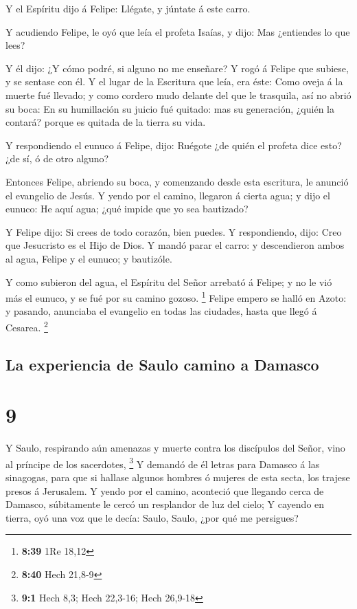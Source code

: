  Y el Espíritu dijo á Felipe: Llégate, y júntate á este
carro.

 Y acudiendo Felipe, le oyó que leía el profeta Isaías, y
dijo: Mas ¿entiendes lo que lees?

 Y él dijo: ¿Y cómo podré, si alguno no me enseñare? Y
rogó á Felipe que subiese, y se sentase con él.  Y el
lugar de la Escritura que leía, era éste: Como oveja á la muerte fué
llevado; y como cordero mudo delante del que le trasquila, así no abrió
su boca:  En su humillación su juicio fué quitado: mas su
generación, ¿quién la contará? porque es quitada de la tierra su vida.

 Y respondiendo el eunuco á Felipe, dijo: Ruégote ¿de
quién el profeta dice esto? ¿de sí, ó de otro alguno?

 Entonces Felipe, abriendo su boca, y comenzando desde
esta escritura, le anunció el evangelio de Jesús.  Y
yendo por el camino, llegaron á cierta agua; y dijo el eunuco: He aquí
agua; ¿qué impide que yo sea bautizado?

 Y Felipe dijo: Si crees de todo corazón, bien puedes. Y
respondiendo, dijo: Creo que Jesucristo es el Hijo de Dios.
 Y mandó parar el carro: y descendieron ambos al agua,
Felipe y el eunuco; y bautizóle.

 Y como subieron del agua, el Espíritu del Señor arrebató
á Felipe; y no le vió más el eunuco, y se fué por su camino gozoso.
\footnote{\textbf{8:39} 1Re 18,12}  Felipe empero se
halló en Azoto: y pasando, anunciaba el evangelio en todas las ciudades,
hasta que llegó á Cesarea. \footnote{\textbf{8:40} Hech 21,8-9}

\hypertarget{la-experiencia-de-saulo-camino-a-damasco}{%
\subsection{La experiencia de Saulo camino a
Damasco}\label{la-experiencia-de-saulo-camino-a-damasco}}

\hypertarget{section-8}{%
\section{9}\label{section-8}}

 Y Saulo, respirando aún amenazas y muerte contra los
discípulos del Señor, vino al príncipe de los sacerdotes, \footnote{\textbf{9:1}
  Hech 8,3; Hech 22,3-16; Hech 26,9-18}  Y demandó de él
letras para Damasco á las sinagogas, para que si hallase algunos hombres
ó mujeres de esta secta, los trajese presos á Jerusalem. 
Y yendo por el camino, aconteció que llegando cerca de Damasco,
súbitamente le cercó un resplandor de luz del cielo;  Y
cayendo en tierra, oyó una voz que le decía: Saulo, Saulo, ¿por qué me
persigues?

